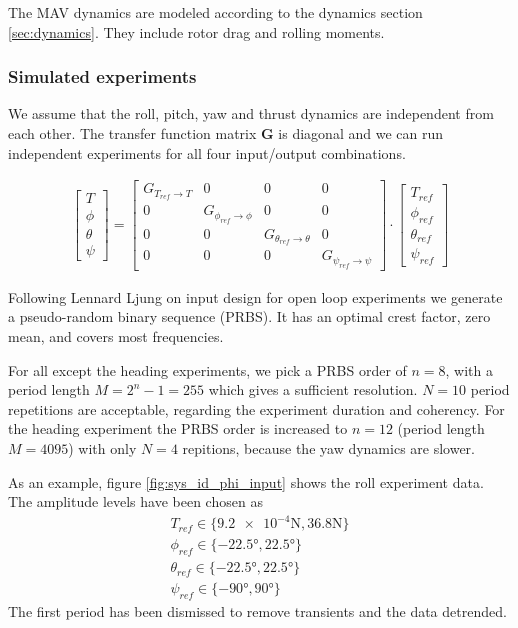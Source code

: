 The MAV dynamics are modeled according to the dynamics section \ref{sec:dynamics}. They include rotor drag and rolling moments.

\subsubsection{Simulated experiments}
We assume that the roll, pitch, yaw and thrust dynamics are independent from each other. The transfer function matrix $\mathbf{G}$ is diagonal and we can run independent experiments for all four input/output combinations.

\begin{align}
\begin{bmatrix}
T \\ \phi \\ \theta \\ \psi
\end{bmatrix}
=
\begin{bmatrix}
G_{T_{ref} \rightarrow T} & 0 & 0 & 0 \\ 
0 & G_{\phi_{ref} \rightarrow \phi} & 0 & 0 \\ 
0 & 0 & G_{\theta_{ref} \rightarrow \theta} & 0 \\ 
0 & 0 & 0 & G_{\psi_{ref} \rightarrow \psi}  
\end{bmatrix}
\cdot
\begin{bmatrix}
T_{ref} \\ \phi_{ref} \\ \theta_{ref} \\ \psi_{ref}
\end{bmatrix}
\end{align}

Following Lennard Ljung on input design for open loop experiments \cite{ljung1999system} we generate a pseudo-random binary sequence (PRBS). It has an optimal crest factor, zero mean, and covers most frequencies. 

For all except the heading experiments, we pick a PRBS order of $n=8$, with a period length $M = 2^n-1 = 255$ which gives a sufficient resolution. $N = 10$ period repetitions are acceptable, regarding the experiment duration and coherency. For the heading experiment the PRBS order is increased to $n=12$ (period length $M=4095$) with only $N =4$ repitions, because the yaw dynamics are slower.

As an example, figure \ref{fig:sys_id_phi_input} shows the roll experiment data. The amplitude levels have been chosen as
\begin{align}
T_{ref} \in \{\num{9.2e-4} \si{\newton},\num{36.8}\si{\newton}\} \\
\phi_{ref} \in \{-22.5\si{\degree},22.5\si{\degree}\} \\
\theta_{ref} \in \{-22.5\si{\degree},22.5\si{\degree}\} \\
\psi_{ref} \in \{-90\si{\degree},90\si{\degree}\}
\end{align}
The first period has been dismissed to remove transients and the data detrended.

